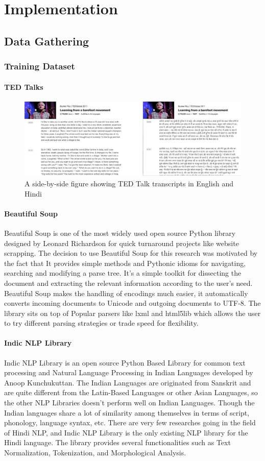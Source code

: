 \chapter{Implementation}
\section{Data Gathering}
\subsection{Training Dataset}
\subsubsection{TED Talks}
\begin{figure}
\includegraphics[width=\textwidth]{figures/tedtalks.png}
\caption{A side-by-side figure showing TED Talk transcripts in English and Hindi} \label{fig1}
\end{figure}
\subsubsection{Beautiful Soup}
Beautiful Soup is one of the most widely used open source Python library designed by Leonard Richardson for quick turnaround projects like website scrapping. The decision to use Beautiful Soup for this research was motivated by the fact that It provides simple methods and Pythonic idioms for navigating, searching and modifying a parse tree. It’s a simple toolkit for dissecting the document and extracting the relevant information according to the user’s need. Beautiful Soup makes the handling of encodings much easier, it automatically converts incoming documents to Unicode and outgoing documents to UTF-8. The library sits on top of Popular parsers like lxml and html5lib which allows the user to try different parsing strategies or trade speed for flexibility. 
\subsubsection{Indic NLP Library}
Indic NLP Library is an open source Python Based Library for common text processing and Natural Language Processing in Indian Languages developed by Anoop Kunchukuttan.  The Indian Languages are originated from Sanskrit and are quite different from the Latin-Based Languages or other Asian Languages, so the other NLP Libraries doesn’t perform well on Indian Languages. Though the Indian languages share a lot of similarity among themselves in terms of script, phonology, language syntax, etc. There are very few researches going in the field of Hindi NLP, and Indic NLP Library is the only existing NLP library for the Hindi language. The library provides several functionalities such as Text Normalization, Tokenization, and Morphological Analysis.
